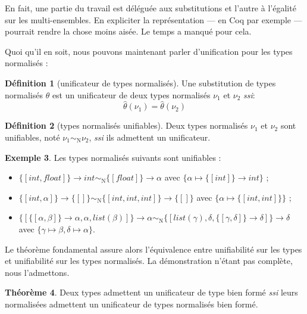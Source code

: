 \documentclass[a4paper]{report}
\theoremstyle{definition}
\newtheorem{theoreme}{Théorème}
\newtheorem{definition}[theoreme]{Définition}
\newtheorem{exemple}[theoreme]{Exemple}
\newcommand{\mset}[1]{\{\![#1]\!\}}
\newcommand{\ssi}{\textit{ssi}\xspace}
\newcommand{\N}{\mathrm{N}}
\begin{document}
En fait, une partie du travail est déléguée aux substitutions et l'autre à l'égalité sur les multi-ensembles. En expliciter la représentation — en Coq par exemple — pourrait rendre la chose moins aisée. Le temps a manqué pour cela.

Quoi qu'il en soit, nous pouvons maintenant parler d'unification pour les types normalisés :

\begin{definition}[unificateur de types normalisés]
	Une substitution de types normalisés $\theta$ est un unificateur de deux types normalisés $\nu_1$ et $\nu_2$ \ssi :
	\[ \hat\theta (\nu_1) = \hat\theta (\nu_2) \]
\end{definition}

\begin{definition}[types normalisés unifiables]
	Deux types normalisés $\nu_1$ et $\nu_2$ sont unifiables, noté $\nu_1 \sim_\N \nu_2$, \ssi ils admettent un unificateur.
\end{definition}

\begin{exemple}
	Les types normalisés suivants sont unifiables :
	\begin{itemize}
		\item $\mset{int, float} \rightarrow int \sim_\N \mset{float} \rightarrow \alpha$ avec $\{ \alpha \mapsto \mset{int} \rightarrow int \}$ ;
		\item $\mset{int, \alpha} \rightarrow \mset{} \sim_\N \mset{int, int, int} \rightarrow \mset{}$ avec $\{ \alpha \mapsto \mset{int, int} \}$ ;
		\item $\mset{\mset{\alpha, \beta} \rightarrow \alpha, \alpha, list (\beta)} \rightarrow \alpha \sim_\N \mset{list (\gamma), \delta, \mset{\gamma, \delta} \rightarrow \delta} \rightarrow \delta$ \\ avec $\{ \gamma \mapsto \beta, \delta \mapsto \alpha \}$.
	\end{itemize}
\end{exemple}

Le théorème fondamental assure alors l'équivalence entre unifiabilité sur les types et unifiabilité sur les types normalisés. La démonstration n'étant pas complète, nous l'admettons.

\begin{theoreme}
	Deux types admettent un unificateur de type bien formé \ssi leurs normalisées admettent un unificateur de types normalisés bien formé.
\end{theoreme}

\end{document}
